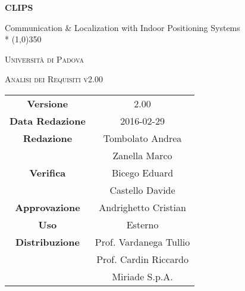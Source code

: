 \documentclass[a4paper,12pt]{article}
\author{Oscar Elia Conti, Marco Zanella}
\date{9/12/2015}
\begin{document}
	\begin{titlepage}
		\centering
		{\huge\bfseries CLIPS\par}
	Communication \& Localization with Indoor Positioning Systems \\*
	\line(1,0){350} \\
	{\scshape\LARGE Università di Padova \par}
	\vspace{1cm}
	{\scshape\Large Analisi dei Requisiti v2.00\par}
	\logo
	\newpage
		\begin{tabular}{c|c}
			{\hfill \textbf{Versione}} 			& 2.00			\\
			{\hfill\textbf{Data Redazione}} 		& 2016-02-29  		\\
			{\hfill\textbf{Redazione}}
										& Tombolato Andrea \\
										& Zanella Marco \\
			{\hfill\textbf{Verifica}} 				& Bicego Eduard \\
													& Castello Davide \\
			{\hfill\textbf{Approvazione}} 		& Andrighetto Cristian \\
			{\hfill\textbf{Uso}} 					& Esterno			\\
			{\hfill\textbf{Distribuzione}} 			& Prof. Vardanega Tullio \\
											& Prof. Cardin Riccardo \\
											& Miriade S.p.A. \\
		\end{tabular}
	\end{titlepage}
	\newpage
		\pagestyle{myfront}
		

	\newpage
		\tableofcontents
	\newpage
		\listoftables
	\newpage
		\listoffigures
	\label{LastFrontPage}

	\newpage
	\pagestyle{mymain}
		
	\newpage
		
	\newpage
		
	\newpage
		
	\label{LastPage}
\end{document}
